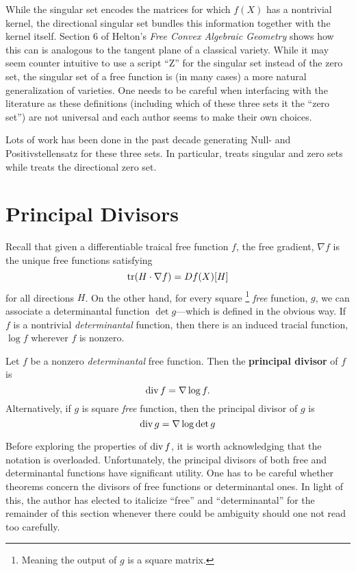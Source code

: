 While the singular set encodes the matrices for which \(f(X)\) has a nontrivial
kernel, the directional singular set bundles this information together with the
kernel itself. Section 6 of Helton's \emph{Free Convex Algebraic Geometry}
\cite{heltonFree2013} shows how this can is analogous to the tangent plane of a
classical variety. While it may seem counter intuitive to use a script ``Z''
for the singular set instead of the zero set, the singular set of a free
function is (in many cases) a more natural generalization of varieties.
One needs to be careful when interfacing with the literature as these
definitions (including which of these three sets it the ``zero set'') are not
universal and each author seems to make their own choices.

{\color{fgreen} Lots of work has been done in the past decade} generating Null- and
Positivstellensatz for these three sets. In particular,
\cite{heltonFactorization2019} treats singular and zero sets while
\cite{heltonStrong2007} treats the directional zero set.

\section{Principal Divisors}%
\label{sec:prindiv}

Recall that given a differentiable traical free function \(f\), the free
gradient, \(\nabla f\) is the unique free functions satisfying
\[
  \operatorname{tr} (H \cdot \nabla f) = Df(X)[H]
\]
for all directions \(H\). On the other hand, for every square
\footnote{Meaning the output of \(g\) is a square matrix.}
\emph{free} function, \(g\), we can associate a determinantal function
\(\det g\)---which is defined in the obvious way. If \(f\) is a nontrivial
\emph{determinantal} function, then there is an induced tracial function,
\(\log f\) wherever \(f\) is nonzero.


\begin{definition}%
\label{def:princdiv}
Let \(f\) be a nonzero \emph{determinantal} free function. Then the
\textbf{principal divisor} of \(f\) is
\[
  \operatorname{div} f = \nabla \log f.
\]
Alternatively, if \(g\) is square \emph{free} function, then the principal divisor of
\(g\) is
\[
  \operatorname{div} g = \nabla \log \det g
\]
\end{definition}

Before exploring the properties of \(\operatorname{div} f\), it is worth acknowledging that
the notation is overloaded. Unfortunately, the principal divisors of both free
and determinantal functions have significant utility. One has to be careful
whether theorems concern the divisors of free functions or determinantal ones.
In light of this, the author has elected to italicize ``free'' and
``determinantal'' for the remainder of this section whenever there could be
ambiguity should one not read too carefully.

